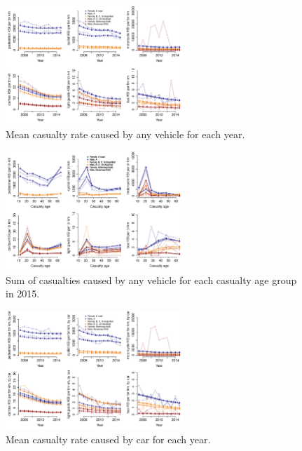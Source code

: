 \documentclass{article}
\begin{document}
\begin{figure}[H]
\centering
\includegraphics[width=0.6\textwidth]{pred6year.pdf}
\caption{\small Mean casualty rate caused by any vehicle for each year.}
\label{pred6year}
\end{figure}

\begin{figure}[H]
\centering
\includegraphics[width=0.6\textwidth]{pred6Age2015.pdf}
\caption{\small Sum of casualties caused by any vehicle for each casualty age group in 2015.}
\label{pred6Age2015}
\end{figure}

\begin{figure}[H]
\centering
\includegraphics[width=0.6\textwidth]{pred6yearCar.pdf}
\caption{\small Mean casualty rate caused by car for each year.}
\label{pred6yearCar}
\end{figure}
\end{document}
